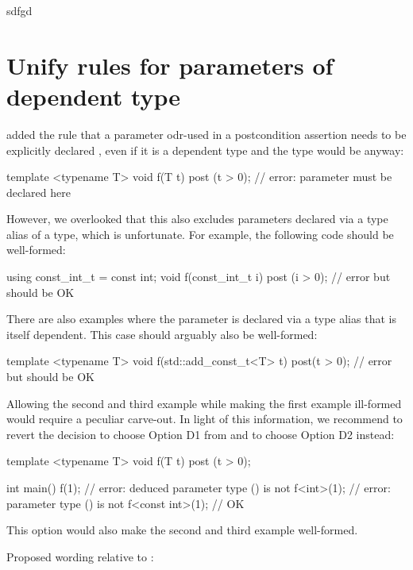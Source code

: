 sdfgd

\section{Unify rules for parameters of dependent type}

\cite{P3489R0} added the rule that a parameter odr-used in a postcondition assertion needs to be explicitly declared , even if it is a dependent type and the type would be  anyway:

\begin{codeblock}
template <typename T>
void f(T t) post (t > 0);  // error: parameter must be declared  here
\end{codeblock}

However, we overlooked that this also excludes parameters declared via a type alias of a  type, which is unfortunate. For example, the following code should be well-formed:

\begin{codeblock}
using const_int_t = const int;
void f(const_int_t i) post (i > 0);  // error but should be OK
\end{codeblock}

There are also examples where the parameter is declared via a type alias that is itself dependent. This case should arguably also be well-formed:

\begin{codeblock}
template <typename T>
void f(std::add_const_t<T> t) post(t > 0);  // error but should be OK
\end{codeblock}

Allowing the second and third example while making the first example ill-formed would require a peculiar carve-out. In light of this information, we recommend to revert the decision to choose Option D1 from \cite{P3489R0} and to choose Option D2 instead:
\begin{codeblock}
template <typename T>
void f(T t) post (t > 0);  

int main() {
  f(1);              // error: deduced parameter type () is not 
  f<int>(1);         // error: parameter type () is not 
  f<const int>(1);   // OK
}
\end{codeblock}
This option would also make the second and third example well-formed.

Proposed wording relative to \cite{P2900R11}:

